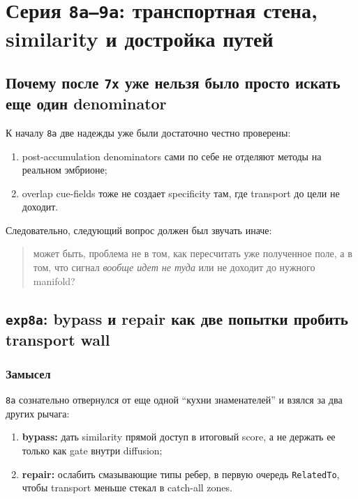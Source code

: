 \chapter{Серия \texttt{8a--9a}: транспортная стена, similarity и достройка путей}

\section{Почему после \texttt{7x} уже нельзя было просто искать еще один denominator}

К началу \texttt{8a} две надежды уже были достаточно честно проверены:

\begin{enumerate}[leftmargin=2em]
\item post-accumulation denominators сами по себе не отделяют методы на реальном
эмбрионе;
\item overlap cue-fields тоже не создает specificity там, где transport до цели
не доходит.
\end{enumerate}

Следовательно, следующий вопрос должен был звучать иначе:

\begin{quote}
может быть, проблема не в том, как пересчитать уже полученное поле, а в том, что
сигнал \emph{вообще идет не туда} или не доходит до нужного manifold?
\end{quote}

\section{\texttt{exp8a}: bypass и repair как две попытки пробить transport wall}

\subsection{Замысел}

\texttt{8a} сознательно отвернулся от еще одной ``кухни знаменателей'' и взялся
за два других рычага:

\begin{enumerate}[leftmargin=2em]
\item \textbf{bypass:} дать similarity прямой доступ в итоговый score, а не
держать ее только как gate внутри diffusion;
\item \textbf{repair:} ослабить смазывающие типы ребер, в первую очередь
\texttt{RelatedTo}, чтобы transport меньше стекал в catch-all zones.
\end{enumerate}


